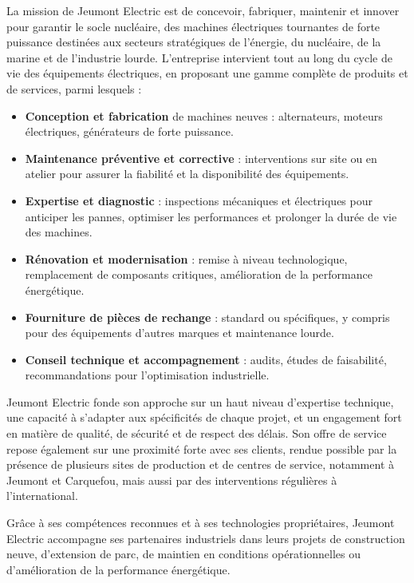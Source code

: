 \documentclass[11pt,a4paper]{article}
\begin{document}
La mission de Jeumont Electric est de concevoir, fabriquer, maintenir et innover pour garantir le socle nucléaire, des machines électriques tournantes de forte puissance destinées aux secteurs stratégiques de l'énergie, du nucléaire, de la marine et de l'industrie lourde.
L'entreprise intervient tout au long du cycle de vie des équipements électriques, en proposant une gamme complète de produits et de services, parmi lesquels :

\begin{itemize}
    \item \textbf{Conception et fabrication} de machines neuves : alternateurs, moteurs électriques, générateurs de forte puissance.
    \item \textbf{Maintenance préventive et corrective} : interventions sur site ou en atelier pour assurer la fiabilité et la disponibilité des équipements.
    \item \textbf{Expertise et diagnostic} : inspections mécaniques et électriques pour anticiper les pannes, optimiser les performances et prolonger la durée de vie des machines.
    \item \textbf{Rénovation et modernisation} : remise à niveau technologique, remplacement de composants critiques, amélioration de la performance énergétique.
    \item \textbf{Fourniture de pièces de rechange} : standard ou spécifiques, y compris pour des équipements d’autres marques et maintenance lourde.
    \item \textbf{Conseil technique et accompagnement} : audits, études de faisabilité, recommandations pour l’optimisation industrielle.
\end{itemize}

Jeumont Electric fonde son approche sur un haut niveau d'expertise technique, une capacité à s'adapter aux spécificités de chaque projet, et un engagement fort en matière de qualité, de sécurité et de respect des délais. Son offre de service repose également sur une proximité forte avec ses clients, rendue possible par la présence de plusieurs sites de production et de centres de service, notamment à Jeumont et Carquefou, mais aussi par des interventions régulières à l'international.

Grâce à ses compétences reconnues et à ses technologies propriétaires, Jeumont Electric
accompagne ses partenaires industriels dans leurs projets de construction neuve, d'extension de
parc, de maintien en conditions opérationnelles ou d'amélioration de la performance énergétique.
\end{document}
